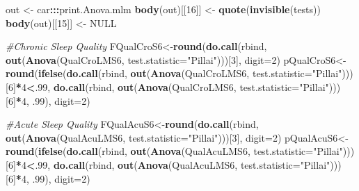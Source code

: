 \documentclass[
]{book}
\newenvironment{Shaded}{\begin{snugshade}}{\end{snugshade}}
\newcommand{\CommentTok}[1]{\textcolor[rgb]{0.56,0.35,0.01}{\textit{#1}}}
\newcommand{\DataTypeTok}[1]{\textcolor[rgb]{0.13,0.29,0.53}{#1}}
\newcommand{\DecValTok}[1]{\textcolor[rgb]{0.00,0.00,0.81}{#1}}
\newcommand{\FloatTok}[1]{\textcolor[rgb]{0.00,0.00,0.81}{#1}}
\newcommand{\KeywordTok}[1]{\textcolor[rgb]{0.13,0.29,0.53}{\textbf{#1}}}
\newcommand{\NormalTok}[1]{#1}
\newcommand{\OperatorTok}[1]{\textcolor[rgb]{0.81,0.36,0.00}{\textbf{#1}}}
\newcommand{\OtherTok}[1]{\textcolor[rgb]{0.56,0.35,0.01}{#1}}
\newcommand{\StringTok}[1]{\textcolor[rgb]{0.31,0.60,0.02}{#1}}
\begin{document}
\begin{Shaded}
\begin{Highlighting}[]
\NormalTok{out <-}\StringTok{ }\NormalTok{car}\OperatorTok{:::}\NormalTok{print.Anova.mlm}
\KeywordTok{body}\NormalTok{(out)[[}\DecValTok{16}\NormalTok{]] <-}\StringTok{ }\KeywordTok{quote}\NormalTok{(}\KeywordTok{invisible}\NormalTok{(tests))}
\KeywordTok{body}\NormalTok{(out)[[}\DecValTok{15}\NormalTok{]] <-}\StringTok{ }\OtherTok{NULL}

\CommentTok{#Chronic Sleep Quality}
\NormalTok{FQualCroS6<-}\KeywordTok{round}\NormalTok{(}\KeywordTok{do.call}\NormalTok{(rbind, }\KeywordTok{out}\NormalTok{(}\KeywordTok{Anova}\NormalTok{(QualCroLMS6, }\DataTypeTok{test.statistic=}\StringTok{"Pillai"}\NormalTok{)))[}\DecValTok{3}\NormalTok{], }\DataTypeTok{digit=}\DecValTok{2}\NormalTok{)}
\NormalTok{pQualCroS6<-}\StringTok{  }\KeywordTok{round}\NormalTok{(}\KeywordTok{ifelse}\NormalTok{(}\KeywordTok{do.call}\NormalTok{(rbind, }\KeywordTok{out}\NormalTok{(}\KeywordTok{Anova}\NormalTok{(QualCroLMS6, }\DataTypeTok{test.statistic=}\StringTok{"Pillai"}\NormalTok{)))[}\DecValTok{6}\NormalTok{]}\OperatorTok{*}\DecValTok{4}\OperatorTok{<}\NormalTok{.}\DecValTok{99}\NormalTok{, }\KeywordTok{do.call}\NormalTok{(rbind, }\KeywordTok{out}\NormalTok{(}\KeywordTok{Anova}\NormalTok{(QualCroLMS6, }\DataTypeTok{test.statistic=}\StringTok{"Pillai"}\NormalTok{)))[}\DecValTok{6}\NormalTok{]}\OperatorTok{*}\DecValTok{4}\NormalTok{, }\FloatTok{.99}\NormalTok{), }\DataTypeTok{digit=}\DecValTok{2}\NormalTok{)}

\CommentTok{#Acute Sleep Quality}
\NormalTok{FQualAcuS6<-}\KeywordTok{round}\NormalTok{(}\KeywordTok{do.call}\NormalTok{(rbind, }\KeywordTok{out}\NormalTok{(}\KeywordTok{Anova}\NormalTok{(QualAcuLMS6, }\DataTypeTok{test.statistic=}\StringTok{"Pillai"}\NormalTok{)))[}\DecValTok{3}\NormalTok{], }\DataTypeTok{digit=}\DecValTok{2}\NormalTok{)}
\NormalTok{pQualAcuS6<-}\StringTok{  }\KeywordTok{round}\NormalTok{(}\KeywordTok{ifelse}\NormalTok{(}\KeywordTok{do.call}\NormalTok{(rbind, }\KeywordTok{out}\NormalTok{(}\KeywordTok{Anova}\NormalTok{(QualAcuLMS6, }\DataTypeTok{test.statistic=}\StringTok{"Pillai"}\NormalTok{)))[}\DecValTok{6}\NormalTok{]}\OperatorTok{*}\DecValTok{4}\OperatorTok{<}\NormalTok{.}\DecValTok{99}\NormalTok{, }\KeywordTok{do.call}\NormalTok{(rbind, }\KeywordTok{out}\NormalTok{(}\KeywordTok{Anova}\NormalTok{(QualAcuLMS6, }\DataTypeTok{test.statistic=}\StringTok{"Pillai"}\NormalTok{)))[}\DecValTok{6}\NormalTok{]}\OperatorTok{*}\DecValTok{4}\NormalTok{, }\FloatTok{.99}\NormalTok{), }\DataTypeTok{digit=}\DecValTok{2}\NormalTok{)}


\end{Highlighting}
\end{Shaded}
\end{document}
